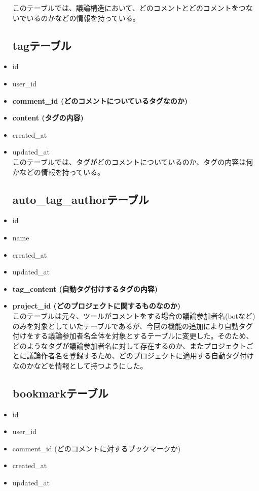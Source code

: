\documentclass[12pt, oneside]{jreport}
\begin{document}
\begin{itemize}
		このテーブルでは、議論構造において、どのコメントとどのコメントをつないでいるのかなどの情報を持っている。
		
		\subsection{tagテーブル}
		\item id
		\item user\_id
		\item {\bf comment\_id (どのコメントについているタグなのか)}
		\item {\bf content (タグの内容)}
		\item created\_at
		\item updated\_at \\
		
		このテーブルでは、タグがどのコメントについているのか、タグの内容は何かなどの情報を持っている。

		\subsection{auto\_tag\_authorテーブル}
		\item id
		\item name
		\item created\_at
		\item updated\_at
		\item {\bf tag\_content (自動タグ付けするタグの内容)}
		\item {\bf project\_id (どのプロジェクトに関するものなのか)} \\
		
		このテーブルは元々、ツールがコメントをする場合の議論参加者名(botなど)のみを対象としていたテーブルであるが、今回の機能の追加により自動タグ付けをする議論参加者名全体を対象とするテーブルに変更した。そのため、どのようなタグが議論参加者名に対して存在するのか、またプロジェクトごとに議論作者名を登録するため、どのプロジェクトに適用する自動タグ付けなのかなどを情報として持つようにした。

		\subsection{bookmarkテーブル}
		\item id
		\item user\_id
		\item comment\_id (どのコメントに対するブックマークか)
		\item created\_at
		\item updated\_at \\
		

\end{itemize}
\end{document}
